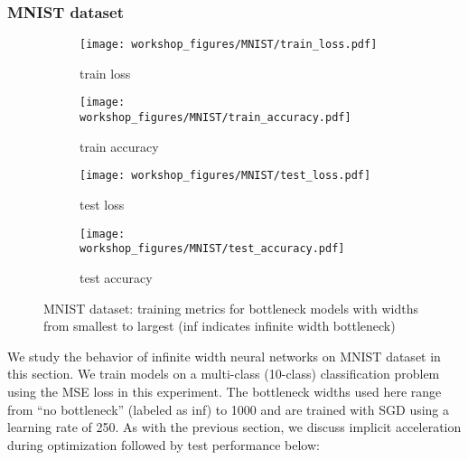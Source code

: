 \documentclass{article}
\theoremstyle{definition}
\theoremstyle{remark}
\renewcommand{\[}{\begin{eqnarray}}
\renewcommand{\]}{\end{eqnarray}}
\renewcommand{\[}{\begin{eqnarray}}
\renewcommand{\]}{\end{eqnarray}}
\begin{document}
\subsubsection{MNIST dataset}
\begin{figure*}[htb]
    \begin{subfigure}[b]{0.25\textwidth}
        \texttt{[image: workshop\_figures/MNIST/train\_loss.pdf]}
        \caption{train loss}
        \label{fig:mnist_lr5k_metrics:train_loss}
    \end{subfigure}\hfill
    \begin{subfigure}[b]{0.25\textwidth}
        \texttt{[image: workshop\_figures/MNIST/train\_accuracy.pdf]}
        \caption{train accuracy}
        \label{fig:mnist_lr5k_metrics:train_acc}
    \end{subfigure}\hfill
    \begin{subfigure}[b]{0.25\textwidth}
        \texttt{[image: workshop\_figures/MNIST/test\_loss.pdf]}
        \caption{test loss}
        \label{fig:mnist_lr5k_metrics:test_loss}
    \end{subfigure}\hfill
    \begin{subfigure}[b]{0.25\textwidth}
        \texttt{[image: workshop\_figures/MNIST/test\_accuracy.pdf]}
        \caption{test accuracy}
        \label{fig:mnist_lr5k_metrics:test_acc}
    \end{subfigure}\hfill
    \caption{{MNIST dataset: training metrics for bottleneck models with widths from smallest to largest (inf indicates infinite width bottleneck)}}%
    \label{fig:mnist_lr5k_metrics}
\end{figure*}
We study the behavior of infinite width neural networks on MNIST dataset \cite{mnist} in this section. We train models on a multi-class (10-class) classification problem using the MSE loss in this experiment. The bottleneck widths used here range from ``no bottleneck'' (labeled as inf) to 1000 and are trained with SGD using a learning rate of 250. As with the previous section, we discuss implicit acceleration during optimization followed by test performance below:
\label{expt:data:mnist}
\end{document}
